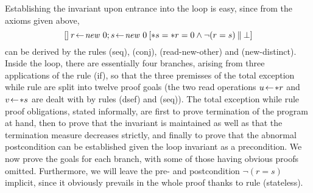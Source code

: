 Establishing the invariant upon entrance into the loop is easy, since
from the axioms given above, 
\begin{equation}\label{eq:init-seq}
[]\:r \!\gets\! \mathit{new}\ 0; s \!\gets\! \mathit{new}\ 0\:[{\ast s} = {\ast r} = 0 \land \lnot (r = s)\:\|\:\bot]
\end{equation}
can be derived by the rules (seq), (conj), (read-new-other) and (new-distinct).
Inside the loop, there are essentially four branches, arising from three
applications of the rule (if), so that the three premisses of the total
exception while rule are split into twelve proof goals (the two read operations
$u\!\gets\! {\ast r}$ and $v\!\gets\! {\ast s}$ are dealt with by rules (dsef) and (seq)).
The total exception while rule proof obligations, stated informally, are first
to prove termination of the program at hand, then to prove that the invariant is
maintained as well as that the termination measure decreases strictly, and
finally to prove that the abnormal postcondition can be established given the
loop invariant as a precondition. We now prove the goals for each branch, with
some of those having obvious proofs omitted. Furthermore, we will leave the pre-
and postcondition $\lnot (r = s)$ implicit, since it obviously prevails in the whole
proof thanks to rule (stateless).

